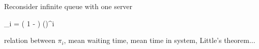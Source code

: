
Reconsider infinite queue with one server

\bee
\pi_i = \left( 1 - \frac{\lambda}{\mu} \right) \left(\frac{\lambda}{\mu}\right)^i
\eee


relation between $\pi_i$, mean waiting time, mean time in system, Little's theorem...



